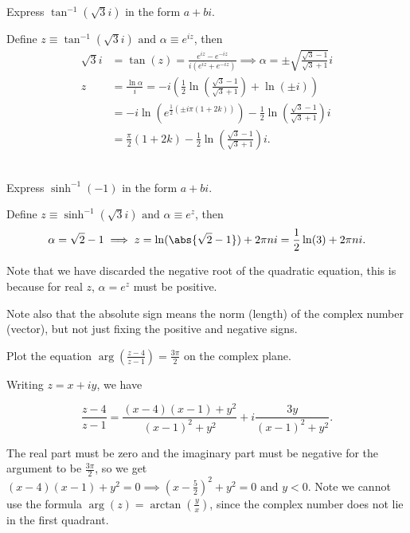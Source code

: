 \documentclass[english,a4paper,12pt]{report}
\begin{document}
{Express \(\tan ^{-1} {(\sqrt{3}i )} \) in the form \(a+bi\). }
{Define \(z \equiv \tan ^{-1} {(\sqrt{3}i)} \text { and } \alpha \equiv e^{iz} \), then 
\begin{equation}
    \begin{aligned}
        \sqrt{3}i &= \tan (z) = \frac{e^{iz}-e^{-iz}  }{i(e^{iz} +e^{-iz} )} \implies \alpha = \pm \sqrt{\frac{\sqrt{3}-1 }{\sqrt{3}+1 } }i \\
        z &= \frac{\ln \alpha }{i} = -i\left( \frac{1}{2}\ln \left(\frac{\sqrt{3}-1 }{\sqrt{3}+1 }\right) + \ln (\pm i)  \right) \\ &= -i\ln (e^{\frac{1}{2}(\pm i\pi (1+2k)) } ) - \frac{1}{2}\ln \left( \frac{\sqrt{3}-1 }{\sqrt{3} +1}  \right) i \\ &= \frac{\pi }{2}(1+2k) - \frac{1}{2}\ln \left( \frac{\sqrt{3}-1 }{\sqrt{3}+1 } \right)i.      
    \end{aligned}
\end{equation}~

 } 

 {Express \(\sinh^{-1}(-1) \) in the form \(a+bi\).   }
 {Define \(z \equiv \sinh^{-1} (\sqrt{3}i) \text { and } \alpha \equiv e^{z} \), then 
 \begin{equation}
        \alpha = \sqrt{2}-1   \implies  z = \ln (\abs{\sqrt{2}-1 })  + 2\pi ni = \frac{1}{2} \ln (3 )+2\pi ni.
 \end{equation}

 Note that we have discarded the negative root of the quadratic equation, this is because for real \(z\), \(\alpha = e^{z} \) must be positive.   

 Note also that the absolute sign means the norm (length) of the complex number (vector), but not just fixing the positive and negative signs.
 
 } 
 


{Plot the equation \(\displaystyle \arg \left(\frac{z-4}{z-1} \right)=\frac{3\pi }{2} \) on the complex plane. }
{Writing \(z = x+iy\), we have 

\begin{equation}
    \frac{z-4}{z-1} = \frac{(x-4)(x-1)+y^2}{(x-1)^2+y^2} + i \frac{3y}{(x-1)^2+y^2}.  
\end{equation}

The real part must be zero and the imaginary part must be negative for the argument to be \(\displaystyle \frac{3\pi }{2} \), so we get \((x-4)(x-1)+y^2=0 \implies (x-\frac{5}{2} )^2+y^2 = 0 \text { and } y<0\). Note we cannot use the formula \(\arg (z) = \displaystyle \arctan {\left(\frac{y}{x}\right) } \), since the complex number does not lie in the first quadrant.   
} 
\end{document}
